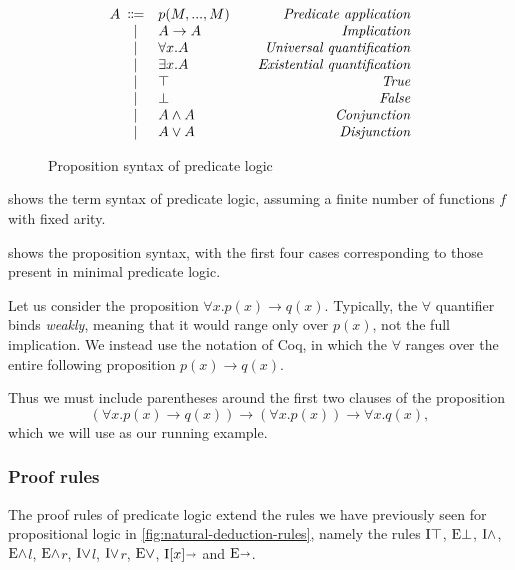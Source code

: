 \begin{figure}[htbp]
    \[
    \begin{array}{r@{\hspace{.5em}}cl@{\hspace{2em}}r}
        A & \Coloneqq & p(M,...,M) & \emph{Predicate application} \\
        & | & A \to A & \emph{Implication} \\
        & | & \forall x. A & \emph{Universal quantification} \\
        & | & \exists x. A & \emph{Existential quantification} \\
        & | & \top & \emph{True} \\
        & | & \bot & \emph{False} \\
        & | & A \land A & \emph{Conjunction} \\
        & | & A \lor A & \emph{Disjunction}
    \end{array}
    \]
    \caption{Proposition syntax of predicate logic}
    \label{fig:predicate-logic-prop-syntax}
\end{figure}

 shows the term syntax of predicate logic,
assuming a finite number of functions $f$ with fixed arity.

 shows the proposition syntax, with the first four cases
corresponding to those present in minimal predicate logic.

Let us consider the proposition $\forall x. p(x) \to q(x)$.
Typically, the $\forall$ quantifier binds \emph{weakly}, meaning that it would range only over $p(x)$,
not the full implication.
We instead use the notation of Coq, in which the $\forall$ ranges over the entire following proposition
$p(x) \to q(x)$.

Thus we must include parentheses around the first two clauses of the proposition
\[ (\forall x. p(x) \to q(x)) \to (\forall x. p(x)) \to \forall x. q(x) ,\]
which we will use as our running example.


\subsubsection{Proof rules}
The proof rules of predicate logic extend the rules we have previously seen for propositional logic
in \cref{fig:natural-deduction-rules}, namely the rules $\text{I} \top$, $\text{E} \bot$, $\text{I} \land$, $\text{E} \land$$l$, $\text{E} \land$$r$, $\text{I} \lor$$l$, $\text{I} \lor$$r$, $\text{E} \lor$, $\text{I}[x] \kern -.25em \shortrightarrow$ and $\text{E} \kern -.25em \shortrightarrow$.

